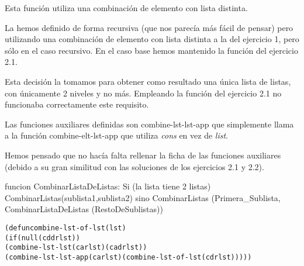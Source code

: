 \begin{aibox}{\comments}
Esta función utiliza una combinación de elemento con lista distinta. 

La hemos definido de forma recursiva (que nos parecía más fácil de pensar) pero utilizando una combinación de elemento con lista distinta a la del ejercicio 1, pero sólo en el caso recursivo. En el caso base hemos mantenido la función del ejercicio 2.1. 

Esta decisión la tomamos para obtener como resultado una única lista de listas, con únicamente 2 niveles y no más. Empleando la función del ejercicio 2.1 no funcionaba correctamente este requisito.

\end{aibox}
\begin{aibox}{\answers}

\end{aibox}
\begin{aibox}{\othercomments}

Las funciones auxiliares definidas son combine-lst-lst-app que simplemente llama a la función combine-elt-lst-app que utiliza \emph{cons} en vez de \emph{list}.

Hemos pensado que no hacía falta rellenar la ficha de las funciones auxiliares (debido a su gran similitud con las soluciones de los ejercicios 2.1 y 2.2).

\end{aibox}
\begin{aibox}{\pseudocode}
funcion CombinarListaDeListas:
	Si (la lista tiene 2 listas)
		CombinarListas(sublista1,sublista2)
	sino
		CombinarListas (Primera\_Sublista, CombinarListaDeListas (RestoDeSublistas))

\end{aibox}
\begin{aibox}{\code}

\begin{alltt}
(defun combine-lst-of-lst (lst)
    (if (null (cddr lst))
            (combine-lst-lst (car lst) (cadr lst))
    (combine-lst-lst-app (car lst) (combine-lst-of-lst (cdr lst)))))

\end{alltt}
\end{aibox}
